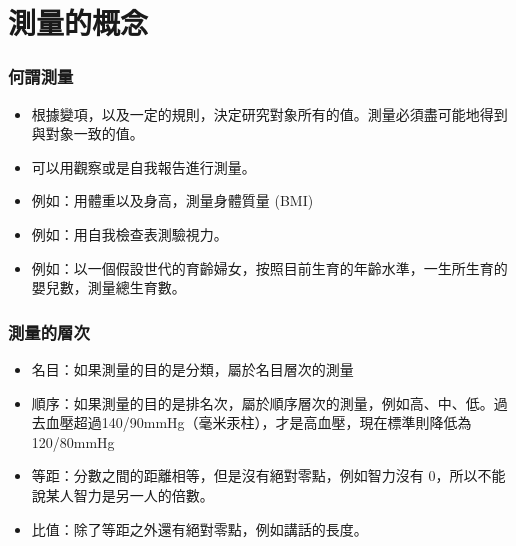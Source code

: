 \documentclass[xcolor=dvipsnames, 13pt]{beamer}
\begin{document}
\section{測量的概念}
\begin{frame}\frametitle{何謂測量}
\begin{itemize}
\item 根據變項，以及一定的規則，決定研究對象所有的值。測量必須盡可能地得到與對象一致的值。
\item 可以用觀察或是自我報告進行測量。
\item 例如：用體重以及身高，測量身體質量 (BMI)
\item 例如：用自我檢查表測驗視力。
\item 例如：以一個假設世代的育齡婦女，按照目前生育的年齡水準，一生所生育的嬰兒數，測量總生育數。
\end{itemize}
\end{frame}

\begin{frame}\frametitle{測量的層次}
\begin{itemize}
\item 名目：如果測量的目的是分類，屬於名目層次的測量
\item 順序：如果測量的目的是排名次，屬於順序層次的測量，例如高、中、低。過去血壓超過140/90mmHg（毫米汞柱），才是高血壓，現在標準則降低為 120/80mmHg
\item 等距：分數之間的距離相等，但是沒有絕對零點，例如智力沒有 0，所以不能說某人智力是另一人的倍數。
\item 比值：除了等距之外還有絕對零點，例如講話的長度。
\end{itemize}
\end{frame}
\end{document}
